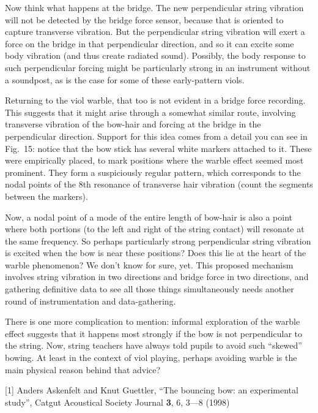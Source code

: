   Now think what happens at the bridge. The new perpendicular string vibration 
  will not be detected by the bridge force sensor, because that is oriented to 
  capture transverse vibration. But the perpendicular string vibration will 
  exert a force on the bridge in that perpendicular direction, and so it can 
  excite some body vibration (and thus create radiated sound). Possibly, the 
  body response to such perpendicular forcing might be particularly strong in 
  an instrument without a soundpost, as is the case for some of these 
  early-pattern viols. 

  Returning to the viol warble, that too is not evident in a bridge force 
  recording. This suggests that it might arise through a somewhat similar 
  route, involving transverse vibration of the bow-hair and forcing at the 
  bridge in the perpendicular direction. Support for this idea comes from a 
  detail you can see in Fig.\ 15: notice that the bow stick has several white 
  markers attached to it. These were empirically placed, to mark positions 
  where the warble effect seemed most prominent. They form a suspiciously 
  regular pattern, which corresponds to the nodal points of the 8th resonance 
  of transverse hair vibration (count the segments between the markers). 

  Now, a nodal point of a mode of the entire length of bow-hair is also a point 
  where both portions (to the left and right of the string contact) will 
  resonate at the same frequency. So perhaps particularly strong perpendicular 
  string vibration is excited when the bow is near these positions? Does this 
  lie at the heart of the warble phenomenon? We don’t know for sure, yet. This 
  proposed mechanism involves string vibration in two directions and bridge 
  force in two directions, and gathering definitive data to see all those 
  things simultaneously needs another round of instrumentation and 
  data-gathering. 

  There is one more complication to mention: informal exploration of the warble 
  effect suggests that it happens most strongly if the bow is not perpendicular 
  to the string. Now, string teachers have always told pupils to avoid such 
  “skewed” bowing. At least in the context of viol playing, perhaps avoiding 
  warble is the main physical reason behind that advice? 



  \sectionreferences{}[1] Anders Askenfelt and Knut Guettler, “The bouncing 
  bow: an experimental study”, Catgut Acoustical Society Journal \textbf{3}, 6, 
  3—8 (1998) 

